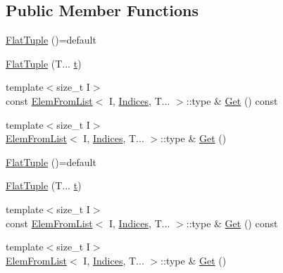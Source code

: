 \subsection*{Public Member Functions}
\begin{DoxyCompactItemize}
\item 
\mbox{\hyperlink{classtesting_1_1internal_1_1_flat_tuple_a056c58b5dd85f470ec5db1db9956c702}{Flat\+Tuple}} ()=default
\item 
\mbox{\hyperlink{classtesting_1_1internal_1_1_flat_tuple_a611d01b9ff2437e4b9cfe3bbedc6d6ae}{Flat\+Tuple}} (T... \mbox{\hyperlink{_mutual_8h_a978d88b393c8a37dc2614c88788b3442}{t}})
\item 
{\footnotesize template$<$size\+\_\+t I$>$ }\\const \mbox{\hyperlink{structtesting_1_1internal_1_1_elem_from_list}{Elem\+From\+List}}$<$ I, \mbox{\hyperlink{classtesting_1_1internal_1_1_flat_tuple_a004b42fc11ac1a85a9b1560fa83cdf77}{Indices}}, T... $>$\+::type \& \mbox{\hyperlink{classtesting_1_1internal_1_1_flat_tuple_a9ea6508fa6413ceca5e38b8077c67938}{Get}} () const
\item 
{\footnotesize template$<$size\+\_\+t I$>$ }\\\mbox{\hyperlink{structtesting_1_1internal_1_1_elem_from_list}{Elem\+From\+List}}$<$ I, \mbox{\hyperlink{classtesting_1_1internal_1_1_flat_tuple_a004b42fc11ac1a85a9b1560fa83cdf77}{Indices}}, T... $>$\+::type \& \mbox{\hyperlink{classtesting_1_1internal_1_1_flat_tuple_a48a13560f8963f727d81a7922e3b3e50}{Get}} ()
\item 
\mbox{\hyperlink{classtesting_1_1internal_1_1_flat_tuple_a056c58b5dd85f470ec5db1db9956c702}{Flat\+Tuple}} ()=default
\item 
\mbox{\hyperlink{classtesting_1_1internal_1_1_flat_tuple_a611d01b9ff2437e4b9cfe3bbedc6d6ae}{Flat\+Tuple}} (T... \mbox{\hyperlink{_mutual_8h_a978d88b393c8a37dc2614c88788b3442}{t}})
\item 
{\footnotesize template$<$size\+\_\+t I$>$ }\\const \mbox{\hyperlink{structtesting_1_1internal_1_1_elem_from_list}{Elem\+From\+List}}$<$ I, \mbox{\hyperlink{classtesting_1_1internal_1_1_flat_tuple_a004b42fc11ac1a85a9b1560fa83cdf77}{Indices}}, T... $>$\+::type \& \mbox{\hyperlink{classtesting_1_1internal_1_1_flat_tuple_a9ea6508fa6413ceca5e38b8077c67938}{Get}} () const
\item 
{\footnotesize template$<$size\+\_\+t I$>$ }\\\mbox{\hyperlink{structtesting_1_1internal_1_1_elem_from_list}{Elem\+From\+List}}$<$ I, \mbox{\hyperlink{classtesting_1_1internal_1_1_flat_tuple_a004b42fc11ac1a85a9b1560fa83cdf77}{Indices}}, T... $>$\+::type \& \mbox{\hyperlink{classtesting_1_1internal_1_1_flat_tuple_a48a13560f8963f727d81a7922e3b3e50}{Get}} ()
\end{DoxyCompactItemize}
